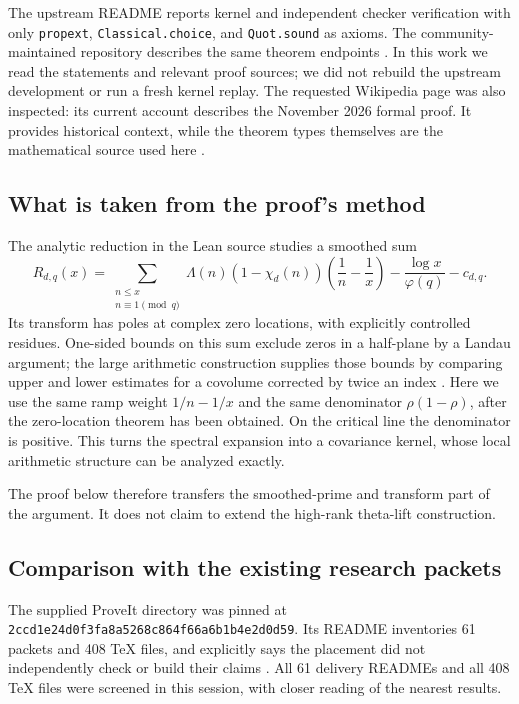 \documentclass[11pt]{article}
\theoremstyle{definition}
\begin{document}
The upstream README reports kernel and independent checker verification with only
\texttt{propext}, \texttt{Classical.choice}, and \texttt{Quot.sound} as axioms.
The community-maintained repository describes the same theorem endpoints
\cite{community}. In this work we read the statements and relevant proof sources;
we did not rebuild the upstream development or run a fresh kernel replay.
The requested Wikipedia page was also inspected: its current account describes
the November 2026 formal proof. It provides historical context, while the theorem
types themselves are the mathematical source used here \cite{wiki}.

\subsection{What is taken from the proof's method}

The analytic reduction in the Lean source studies a smoothed sum
\[
 R_{d,q}(x)=
 \sum_{\substack{n\le x\\n\equiv1\pmod q}}
 \Lambda(n)(1-\chi_d(n))\left(\frac1n-\frac1x\right)
 -\frac{\log x}{\varphi(q)}-c_{d,q}.
\]
Its transform has poles at complex zero locations, with explicitly controlled residues.
One-sided bounds on this sum exclude zeros in a half-plane by a Landau argument;
the large arithmetic construction supplies those bounds by comparing upper and
lower estimates for a covolume corrected by twice an index \cite{guide,primeerror,criterion}.
Here we use the same ramp weight $1/n-1/x$ and the same denominator
$\rho(1-\rho)$, after the zero-location theorem has been obtained. On the critical
line the denominator is positive. This turns the spectral expansion into a
covariance kernel, whose local arithmetic structure can be analyzed exactly.

The proof below therefore transfers the smoothed-prime and transform part of the
argument. It does not claim to extend the high-rank theta-lift construction.

\subsection{Comparison with the existing research packets}

The supplied ProveIt directory was pinned at
\texttt{2ccd1e24d0f3fa8a5268c864f66a6b1b4e2d0d59}. Its README inventories
61 packets and 408 TeX files, and explicitly says the placement did not independently
check or build their claims \cite{proveit}. All 61 delivery READMEs and all 408 TeX
files were screened in this session, with closer reading of the nearest results.
\end{document}

